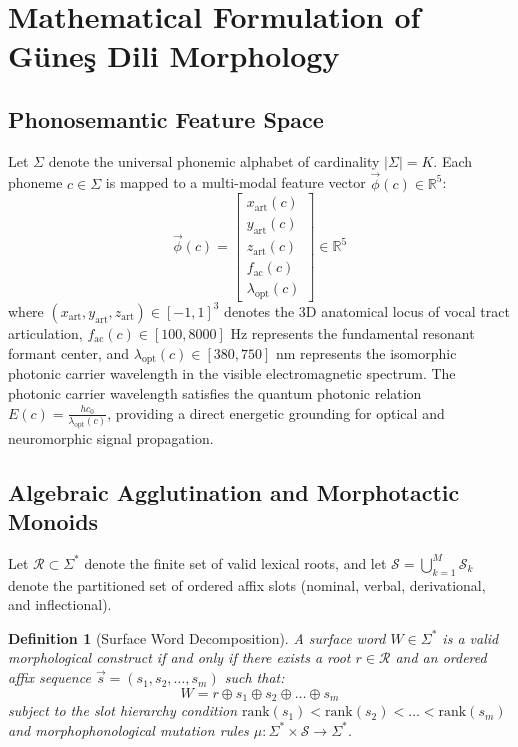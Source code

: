 \documentclass[11pt,a4paper]{article}
\newtheorem{definition}[theorem]{Definition}
\begin{document}
\section{Mathematical Formulation of Güneş Dili Morphology}

\subsection{Phonosemantic Feature Space}

Let $\Sigma$ denote the universal phonemic alphabet of cardinality $|\Sigma| = K$. Each phoneme $c \in \Sigma$ is mapped to a multi-modal feature vector $\vec{\phi}(c) \in \mathbb{R}^5$:
\begin{equation}
\vec{\phi}(c) = \begin{bmatrix}
x_{\text{art}}(c) \\
y_{\text{art}}(c) \\
z_{\text{art}}(c) \\
f_{\text{ac}}(c) \\
\lambda_{\text{opt}}(c)
\end{bmatrix} \in \mathbb{R}^5
\end{equation}
where $(x_{\text{art}}, y_{\text{art}}, z_{\text{art}}) \in [-1, 1]^3$ denotes the 3D anatomical locus of vocal tract articulation, $f_{\text{ac}}(c) \in [100, 8000]\text{ Hz}$ represents the fundamental resonant formant center, and $\lambda_{\text{opt}}(c) \in [380, 750]\text{ nm}$ represents the isomorphic photonic carrier wavelength in the visible electromagnetic spectrum. The photonic carrier wavelength satisfies the quantum photonic relation $E(c) = \frac{h c_0}{\lambda_{\text{opt}}(c)}$, providing a direct energetic grounding for optical and neuromorphic signal propagation.

\subsection{Algebraic Agglutination and Morphotactic Monoids}

Let $\mathcal{R} \subset \Sigma^*$ denote the finite set of valid lexical roots, and let $\mathcal{S} = \bigcup_{k=1}^M \mathcal{S}_k$ denote the partitioned set of ordered affix slots (nominal, verbal, derivational, and inflectional).

\begin{definition}[Surface Word Decomposition]
A surface word $W \in \Sigma^*$ is a valid morphological construct if and only if there exists a root $r \in \mathcal{R}$ and an ordered affix sequence $\vec{s} = (s_1, s_2, \dots, s_m)$ such that:
\begin{equation}
W = r \oplus s_1 \oplus s_2 \oplus \dots \oplus s_m
\end{equation}
subject to the slot hierarchy condition $\text{rank}(s_1) < \text{rank}(s_2) < \dots < \text{rank}(s_m)$ and morphophonological mutation rules $\mu: \Sigma^* \times \mathcal{S} \to \Sigma^*$.
\end{definition}
\end{document}
